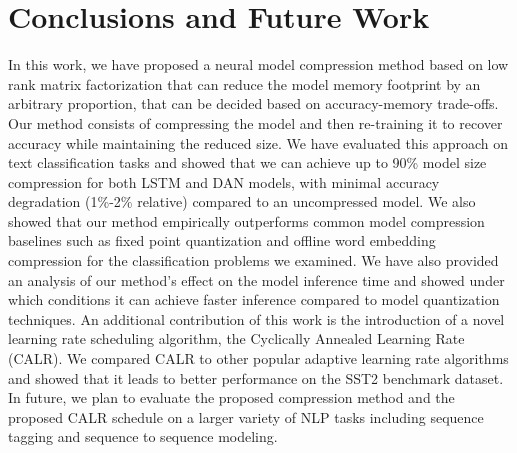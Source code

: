 \section{Conclusions and Future Work}

In this work, we have proposed a neural model compression method based on low
rank matrix factorization that can reduce the model memory footprint by an
arbitrary proportion, that can be decided based on accuracy-memory
trade-offs. Our method consists of compressing the model and then re-training it
to recover accuracy while maintaining the reduced size. We have evaluated this
approach on text classification tasks and showed that we can achieve up to 90\%
model size compression for both LSTM and DAN models, with minimal accuracy degradation (1\%-2\% relative) compared to an uncompressed model. We also showed that our
method empirically outperforms common model compression baselines such as
fixed point quantization and offline word embedding compression for the classification
problems we examined. We have also provided an analysis of our method's
effect on the model inference time and showed under which conditions it can
achieve faster inference compared to model quantization techniques. An additional contribution of this work is the introduction of a novel learning rate scheduling algorithm, the Cyclically Annealed Learning Rate (CALR). We compared CALR to other popular adaptive learning rate algorithms and showed that it leads to better performance on the SST2 benchmark dataset. In future,
we plan to evaluate the proposed compression method and the proposed CALR schedule on a larger variety of NLP tasks including sequence tagging and sequence to sequence modeling. 

